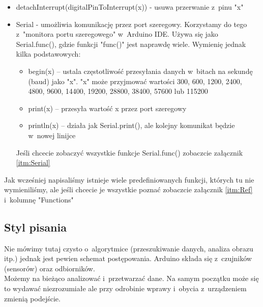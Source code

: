 \documentclass[a4paper,12pt, twoside]{article}
\begin{document}
\begin{itemize}
		\item detachInterrupt(digitalPinToInterrupt(x)) - usuwa przerwanie z~pinu "x"
		\item Serial - umożliwia komunikację przez port szeregowy. Korzystamy do tego z~"monitora portu szeregowego" w~Arduino IDE. Używa się jako Serial.func(), gdzie funkcji "func()" jest naprawdę wiele. Wymienię jednak kilka podstawowych:
			\begin{itemize}
				\item begin(x) -- ustala częstotliwość przesyłania danych w~bitach na sekundę (baud) jako "x". "x" może przyjmować wartości 300, 600, 1200, 2400, 4800, 9600, 14400, 19200, 28800, 38400, 57600 lub 115200
				\item print(x) -- przesyła wartość x przez port szeregowy
				\item println(x) -- działa jak Serial.print(), ale kolejny komunikat będzie w~nowej linijce
			\end{itemize}
			Jeśli chcecie zobaczyć wszystkie funkcje Serial.func() zobaczcie załącznik \ref{itm:Serial}
	\end{itemize}
	Jak wcześniej napisaliśmy istnieje wiele predefiniowanych funkcji, których tu nie wymieniliśmy, ale jeśli chcecie je wszystkie poznać zobaczcie załącznik \ref{itm:Ref} i~kolumnę "Functions"


	\subsection {Styl pisania}
	Nie mówimy tutaj czysto o~algorytmice (przeszukiwanie danych, analiza obrazu itp.) jednak jest pewien schemat postępowania. Arduino składa się z~czujników (sensorów) oraz odbiorników. %
	\\
	Możemy  na bieżąco analizować i~przetwarzać dane. Na samym początku może się to wydawać niezrozumiałe ale przy odrobinie wprawy i~obycia z~urządzeniem zmienią podejście.
		
\end{document}
